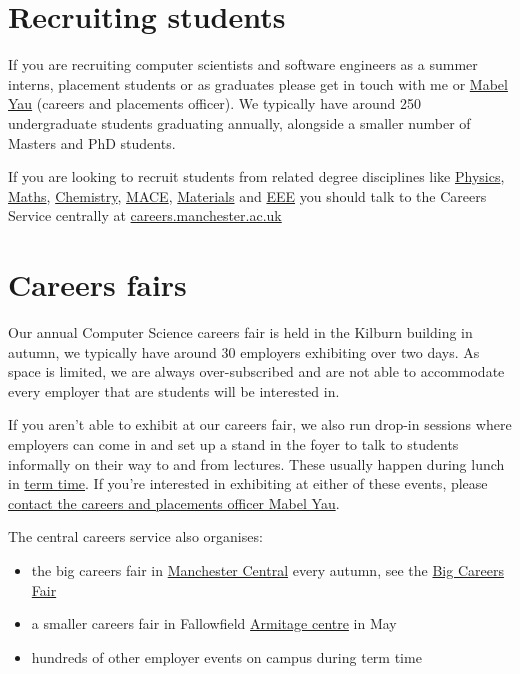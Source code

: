 \documentclass[12pt,]{book}
\providecommand{\tightlist}{%
  \setlength{\itemsep}{0pt}\setlength{\parskip}{0pt}}
\begin{document}
\hypertarget{recruiting-students}{%
\section{Recruiting students}\label{recruiting-students}}

If you are recruiting computer scientists and software engineers as a summer interns, placement students or as graduates please get in touch with me or \href{https://uk.linkedin.com/in/mabel-yau}{Mabel Yau} (careers and placements officer). We typically have around 250 undergraduate students graduating annually, alongside a smaller number of Masters and PhD students.

If you are looking to recruit students from related degree disciplines like \href{https://www.physics.manchester.ac.uk/}{Physics}, \href{https://www.maths.manchester.ac.uk/}{Maths}, \href{https://www.chemistry.manchester.ac.uk/}{Chemistry}, \href{https://www.mace.manchester.ac.uk/}{MACE}, \href{https://www.materials.manchester.ac.uk/}{Materials} and \href{https://www.eee.manchester.ac.uk/}{EEE} you should talk to the Careers Service centrally at \href{http://www.careers.manchester.ac.uk/}{careers.manchester.ac.uk}

\hypertarget{careers-fairs}{%
\section{Careers fairs}\label{careers-fairs}}

Our annual Computer Science careers fair is held in the Kilburn building in autumn, we typically have around 30 employers exhibiting over two days. As space is limited, we are always over-subscribed and are not able to accommodate every employer that are students will be interested in.

If you aren't able to exhibit at our careers fair, we also run drop-in sessions where employers can come in and set up a stand in the foyer to talk to students informally on their way to and from lectures. These usually happen during lunch in \href{https://www.manchester.ac.uk/discover/key-dates/}{term time}. If you're interested in exhibiting at either of these events, please \protect\hyperlink{contact}{contact the careers and placements officer Mabel Yau}.

The central careers service also organises:

\begin{itemize}
\tightlist
\item
  the big careers fair in \href{https://www.manchestercentral.co.uk/}{Manchester Central} every autumn, see the \href{http://www.careers.manchester.ac.uk/events/bigcareersfair/}{Big Careers Fair}
\item
  a smaller careers fair in Fallowfield \href{http://www.sport.manchester.ac.uk/facilities/armitage/}{Armitage centre} in May
\item
  hundreds of other employer events on campus during term time
\end{itemize}
\end{document}
